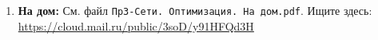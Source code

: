 \documentclass[a4paper,14pt]{extarticle}
\begin{document}
\begin{enumerate}
%
%

\medskip
\item \textbf{На дом:} См. файл \texttt{Пр3-Сети. Оптимизация. На дом.pdf}.  Ищите здесь: \url{https://cloud.mail.ru/public/3soD/y91HFQd3H}
 


\end{enumerate}
\end{document}

